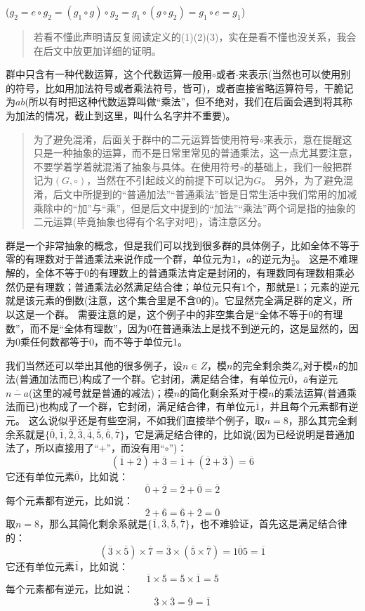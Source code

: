 \documentclass[12pt, a4paper, oneside]{ctexart}
\newenvironment{myquote}{\begin{quote}\small\color{gray}}{\end{quote}}
\begin{document}
($g_2=e\circ g_2=(g_1\circ g)\circ g_2=g_1\circ(g\circ g_2)=g_1\circ e=g_1$)

\begin{myquote}
若看不懂此声明请反复阅读定义的(1)(2)(3)，实在是看不懂也没关系，我会在后文中放更加详细的证明。
\end{myquote}

群中只含有一种代数运算，这个代数运算一般用$\circ$或者$\cdot$来表示(当然也可以使用别的符号，比如用加法符号或者乘法符号，皆可)，或者直接省略运算符号，干脆记为$ab$(所以有时把这种代数运算叫做“乘法”，但不绝对，我们在后面会遇到将其称为加法的情况，截止到这里，叫什么名字并不重要)。

\begin{myquote}
为了避免混淆，后面关于群中的二元运算皆使用符号$\circ$来表示，意在提醒这只是一种抽象的运算，而不是日常里常见的普通乘法，这一点尤其要注意，不要学着学着就混淆了抽象与具体。在使用符号$\circ$的基础上，我们一般把群记为$(G,\circ)$，当然在不引起歧义的前提下可以记为$G$。
另外，为了避免混淆，后文中所提到的“普通加法”“普通乘法”皆是日常生活中我们常用的加减乘除中的“加”与“乘”，但是后文中提到的“加法”“乘法”两个词是指的抽象的二元运算(毕竟抽象也得有个名字对吧)，请注意区分。
\end{myquote}

群是一个非常抽象的概念，但是我们可以找到很多群的具体例子，比如全体不等于零的有理数对于普通乘法来说作成一个群，单位元为1，$a$的逆元为$\frac{1}{a}$。
这是不难理解的，全体不等于0的有理数上的普通乘法肯定是封闭的，有理数同有理数相乘必然仍是有理数；普通乘法必然满足结合律；单位元只有1个，那就是1；元素的逆元就是该元素的倒数(注意，这个集合里是不含0的)。它显然完全满足群的定义，所以这是一个群。
需要注意的是，这个例子中的非空集合是“全体不等于0的有理数”，而不是“全体有理数”，因为0在普通乘法上是找不到逆元的，这是显然的，因为0乘任何数都等于0，而不等于单位元1。

我们当然还可以举出其他的很多例子，设$n\in Z$，模$n$的完全剩余类$Z_n$对于模$n$的加法(普通加法而已)构成了一个群。它封闭，满足结合律，有单位元$\overline{0}$，$\overline{a}$有逆元$\overline{n-a}$(这里的减号就是普通的减法)；模$n$的简化剩余系对于模$n$的乘法运算(普通乘法而已)也构成了一个群，它封闭，满足结合律，有单位元$\overline{1}$，并且每个元素都有逆元。
这么说似乎还是有些空洞，不如我们直接举个例子，取$n=8$，那么其完全剩余系就是$\{\overline{0},\overline{1},\overline{2},\overline{3},\overline{4},\overline{5},\overline{6},\overline{7}\}$，它是满足结合律的，比如说(因为已经说明是普通加法了，所以直接用了“+”，而没有用“$\circ$”)：
\[
(\overline{1}+\overline{2})+\overline{3}=\overline{1}+(\overline{2}+\overline{3})=\overline{6}
\]
它还有单位元素$\overline{0}$，比如说：
\[
\overline{0}+\overline{2}=\overline{2}+\overline{0}=\overline{2}
\]
每个元素都有逆元，比如说：
\[
\overline{2}+\overline{6}=\overline{6}+\overline{2}=\overline{0}
\]
取$n=8$，那么其简化剩余系就是$\{\overline{1},\overline{3},\overline{5},\overline{7}\}$，也不难验证，首先这是满足结合律的：
\[
(\overline{3}\times\overline{5})\times\overline{7}=\overline{3}\times(\overline{5}\times\overline{7})=\overline{105}=\overline{1}
\]
它还有单位元素$\overline{1}$，比如说：
\[
\overline{1}\times\overline{5}=\overline{5}\times\overline{1}=\overline{5}
\]
每个元素都有逆元，比如说：
\[
\overline{3}\times\overline{3}=\overline{9}=\overline{1}
\]
\end{document}
